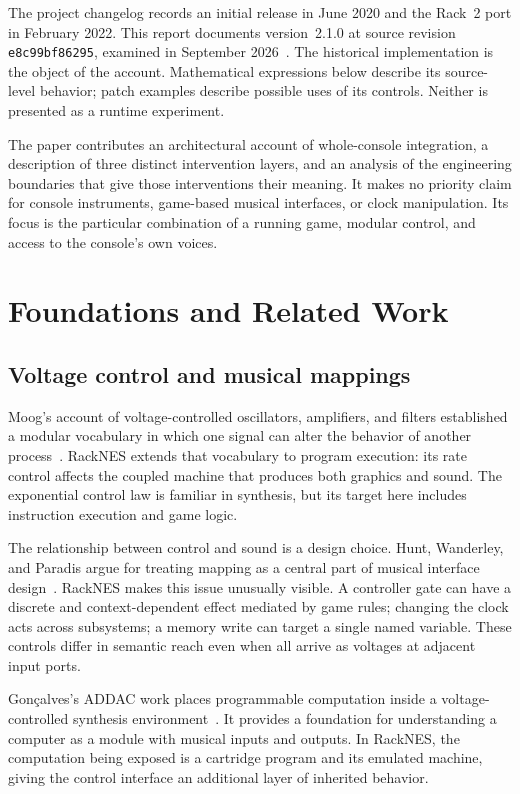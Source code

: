 \documentclass[10pt,letterpaper,twocolumn]{article}
\newcommand{\code}[1]{\texttt{#1}}
\begin{document}
The project changelog records an initial release in June 2020 and the Rack~2
port in February 2022. This report documents version~2.1.0 at source revision
\code{e8c99bf86295}, examined in September 2026~\cite{racknes}. The historical
implementation is the object of the account. Mathematical expressions below
describe its source-level behavior; patch examples describe possible uses of
its controls. Neither is presented as a runtime experiment.

The paper contributes an architectural account of whole-console integration,
a description of three distinct intervention layers, and an analysis of the
engineering boundaries that give those interventions their meaning. It makes
no priority claim for console instruments, game-based musical interfaces, or
clock manipulation. Its focus is the particular combination of a running game,
modular control, and access to the console's own voices.

\section{Foundations and Related Work}
\subsection{Voltage control and musical mappings}
Moog's account of voltage-controlled oscillators, amplifiers, and filters
established a modular vocabulary in which one signal can alter the behavior
of another process~\cite{moog1965}. RackNES extends that vocabulary to program
execution: its rate control affects the coupled machine that produces both
graphics and sound. The exponential control law is familiar in synthesis, but
its target here includes instruction execution and game logic.

The relationship between control and sound is a design choice. Hunt,
Wanderley, and Paradis argue for treating mapping as a central part of musical
interface design~\cite{hunt2002}. RackNES makes this issue unusually visible.
A controller gate can have a discrete and context-dependent effect mediated
by game rules; changing the clock acts across subsystems; a memory write can
target a single named variable. These controls differ in semantic reach even
when all arrive as voltages at adjacent input ports.

Gon\c{c}alves's ADDAC work places programmable computation inside a
voltage-controlled synthesis environment~\cite{goncalves2011}. It provides a
foundation for understanding a computer as a module with musical inputs and
outputs. In RackNES, the computation being exposed is a cartridge program
and its emulated machine, giving the control interface an additional layer
of inherited behavior.
\end{document}
